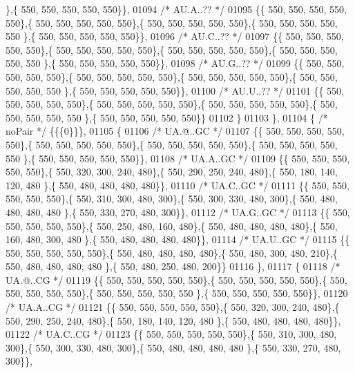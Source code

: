 \begin{DoxyCode}
      \},\{ 550, 550, 550, 550, 550\}\},
01094 \textcolor{comment}{/* AU.A..?? */}
01095 \{\{ 550, 550, 550, 550, 550\},\{ 550, 550, 550, 550, 550\},\{ 550, 550, 550, 550, 550\},\{ 550, 550, 550, 550, 550
      \},\{ 550, 550, 550, 550, 550\}\},
01096 \textcolor{comment}{/* AU.C..?? */}
01097 \{\{ 550, 550, 550, 550, 550\},\{ 550, 550, 550, 550, 550\},\{ 550, 550, 550, 550, 550\},\{ 550, 550, 550, 550, 550
      \},\{ 550, 550, 550, 550, 550\}\},
01098 \textcolor{comment}{/* AU.G..?? */}
01099 \{\{ 550, 550, 550, 550, 550\},\{ 550, 550, 550, 550, 550\},\{ 550, 550, 550, 550, 550\},\{ 550, 550, 550, 550, 550
      \},\{ 550, 550, 550, 550, 550\}\},
01100 \textcolor{comment}{/* AU.U..?? */}
01101 \{\{ 550, 550, 550, 550, 550\},\{ 550, 550, 550, 550, 550\},\{ 550, 550, 550, 550, 550\},\{ 550, 550, 550, 550, 550
      \},\{ 550, 550, 550, 550, 550\}\}
01102 \}
01103 \},
01104 \{ \textcolor{comment}{/* noPair */} \{\{\{0\}\}\},
01105 \{
01106 \textcolor{comment}{/* UA.@..GC */}
01107 \{\{ 550, 550, 550, 550, 550\},\{ 550, 550, 550, 550, 550\},\{ 550, 550, 550, 550, 550\},\{ 550, 550, 550, 550, 550
      \},\{ 550, 550, 550, 550, 550\}\},
01108 \textcolor{comment}{/* UA.A..GC */}
01109 \{\{ 550, 550, 550, 550, 550\},\{ 550, 320, 300, 240, 480\},\{ 550, 290, 250, 240, 480\},\{ 550, 180, 140, 120, 480
      \},\{ 550, 480, 480, 480, 480\}\},
01110 \textcolor{comment}{/* UA.C..GC */}
01111 \{\{ 550, 550, 550, 550, 550\},\{ 550, 310, 300, 480, 300\},\{ 550, 300, 330, 480, 300\},\{ 550, 480, 480, 480, 480
      \},\{ 550, 330, 270, 480, 300\}\},
01112 \textcolor{comment}{/* UA.G..GC */}
01113 \{\{ 550, 550, 550, 550, 550\},\{ 550, 250, 480, 160, 480\},\{ 550, 480, 480, 480, 480\},\{ 550, 160, 480, 300, 480
      \},\{ 550, 480, 480, 480, 480\}\},
01114 \textcolor{comment}{/* UA.U..GC */}
01115 \{\{ 550, 550, 550, 550, 550\},\{ 550, 480, 480, 480, 480\},\{ 550, 480, 300, 480, 210\},\{ 550, 480, 480, 480, 480
      \},\{ 550, 480, 250, 480, 200\}\}
01116 \},
01117 \{
01118 \textcolor{comment}{/* UA.@..CG */}
01119 \{\{ 550, 550, 550, 550, 550\},\{ 550, 550, 550, 550, 550\},\{ 550, 550, 550, 550, 550\},\{ 550, 550, 550, 550, 550
      \},\{ 550, 550, 550, 550, 550\}\},
01120 \textcolor{comment}{/* UA.A..CG */}
01121 \{\{ 550, 550, 550, 550, 550\},\{ 550, 320, 300, 240, 480\},\{ 550, 290, 250, 240, 480\},\{ 550, 180, 140, 120, 480
      \},\{ 550, 480, 480, 480, 480\}\},
01122 \textcolor{comment}{/* UA.C..CG */}
01123 \{\{ 550, 550, 550, 550, 550\},\{ 550, 310, 300, 480, 300\},\{ 550, 300, 330, 480, 300\},\{ 550, 480, 480, 480, 480
      \},\{ 550, 330, 270, 480, 300\}\},

\end{DoxyCode}
